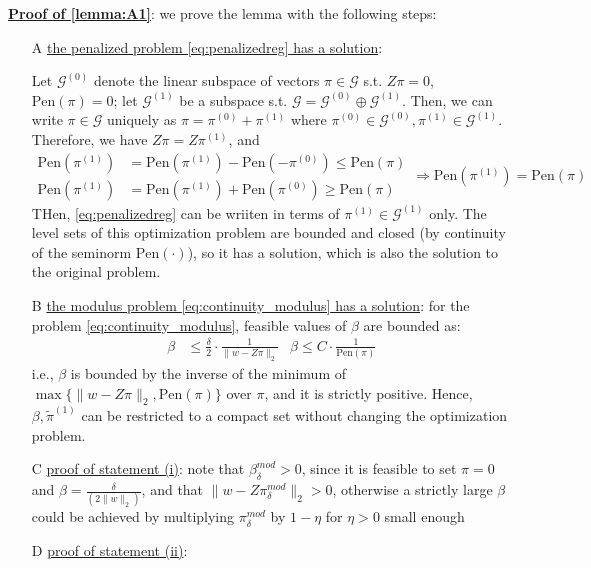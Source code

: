\documentclass[twoside]{article}
\theoremstyle{definition}
\begin{document}
\underline{\textbf{Proof of \ref{lemma:A1}}}: we prove the lemma with the following steps:
\begin{itemize}
  \item[A] \underline{the penalized problem \ref{eq:penalizedreg} has a solution}: 
  
  Let $\mathcal{G}^{(0)}$ denote the linear subspace of vectors $\pi \in \mathcal{G}$ s.t. $Z\pi=0$, $\mathrm{Pen}(\pi)=0$; let $\mathcal{G}^{(1)}$ be a subspace s.t. $\mathcal{G}=\mathcal{G}^{(0)} \oplus \mathcal{G}^{(1)}$. Then, we can write $\pi \in \mathcal{G}$ uniquely as $\pi = \pi^{(0)}+\pi^{(1)}$ where $\pi^{(0)} \in\mathcal{G}^{(0)},\pi^{(1)}\in\mathcal{G}^{(1)}$. Therefore, we have $Z\pi = Z\pi^{(1)}$, and 
  $$
  \begin{aligned}
    \mathrm{Pen}(\pi^{(1)}) &= \mathrm{Pen}(\pi^{(1)}) - \mathrm{Pen}(-\pi^{(0)}) \leq \mathrm{Pen}(\pi)\\
      \mathrm{Pen}(\pi^{(1)}) &= \mathrm{Pen}(\pi^{(1)}) + \mathrm{Pen}(\pi^{(0)}) \geq \mathrm{Pen}(\pi)
  \end{aligned} \Rightarrow \mathrm{Pen}(\pi^{(1)}) = \mathrm{Pen}(\pi)
  $$
  THen, \ref{eq:penalizedreg} can be wriiten in terms of $\pi^{(1)}\in\mathcal{G}^{(1)}$ only. The level sets of this optimization problem are bounded and closed (by continuity of the seminorm $\mathrm{Pen}(\cdot)$), so it has a solution, which is also the solution to the original problem.
  \item[B] \underline{the modulus problem \ref{eq:continuity_modulus} has a solution}: for the problem \ref{eq:continuity_modulus}, feasible values of $\beta$ are bounded as:
  \begin{align*}
    \beta &\leq \frac{\delta}{2}\cdot \frac{1}{\lVert w-Z\pi \rVert_2} & \beta \leq C \cdot\frac{1}{\mathrm{Pen}(\pi)}
  \end{align*}
  i.e., $\beta$ is bounded by the inverse of the minimum of $\max \{ \lVert w-Z\pi \rVert_2,\mathrm{Pen}(\pi) \}$ over $\pi$, and it is strictly positive. Hence, $\beta,\tilde{\pi}^{(1)}$ can be restricted to a compact set without changing the optimization problem.
  \item[C] \underline{proof of statement (i)}: note that $\beta^{mod}_{\delta}>0$, since it is feasible to set $\pi=0$ and $\beta=\frac{\delta}{(2\lVert w \rVert_2)}$, and that $\lVert w-Z\pi^{mod}_{\delta} \rVert_2>0$, otherwise a strictly large $\beta$ could be achieved by multiplying $\pi^{mod}_{\delta}$ by $1-\eta$ for $\eta>0$ small enough
  \item[D] \underline{proof of statement (ii)}:
\end{itemize}


\newpage


\end{document}
